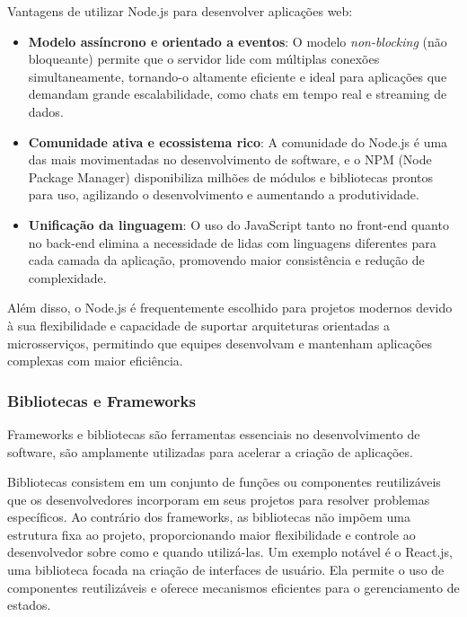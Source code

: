 Vantagens de utilizar Node.js para desenvolver aplicações web:

\begin{itemize}
    \item \textbf{Modelo assíncrono e orientado a eventos}: O modelo \emph{non-blocking} (não bloqueante) permite que o servidor lide com múltiplas conexões simultaneamente, tornando-o altamente eficiente e ideal para aplicações que demandam grande escalabilidade, como chats em tempo real e streaming de dados.
    \item \textbf{Comunidade ativa e ecossistema rico}: A comunidade do Node.js é uma das mais movimentadas no desenvolvimento de software\cite{size-programming-languages}, e o NPM (Node Package Manager) disponibiliza milhões de módulos e bibliotecas prontos para uso, agilizando o desenvolvimento e aumentando a produtividade.
    \item \textbf{Unificação da linguagem}: O uso do JavaScript tanto no front-end quanto no back-end elimina a necessidade de lidas com linguagens diferentes para cada camada da aplicação, promovendo maior consistência e redução de complexidade.
\end{itemize}

Além disso, o Node.js é frequentemente escolhido para projetos modernos devido à sua flexibilidade e capacidade de suportar arquiteturas orientadas a microsserviços, permitindo que equipes desenvolvam e mantenham aplicações complexas com maior eficiência.

\subsubsection{Bibliotecas e Frameworks}


Frameworks e bibliotecas são ferramentas essenciais no desenvolvimento de software, são amplamente utilizadas para acelerar a criação de aplicações.

Bibliotecas consistem em um conjunto de funções ou componentes reutilizáveis que os desenvolvedores incorporam em seus projetos para resolver problemas específicos. Ao contrário dos frameworks, as bibliotecas não impõem uma estrutura fixa ao projeto, proporcionando maior flexibilidade e controle ao desenvolvedor sobre como e quando utilizá-las\cite{libs-vs-frameworks}. Um exemplo notável é o React.js, uma biblioteca focada na criação de interfaces de usuário. Ela permite o uso de componentes reutilizáveis e oferece mecanismos eficientes para o gerenciamento de estados.

